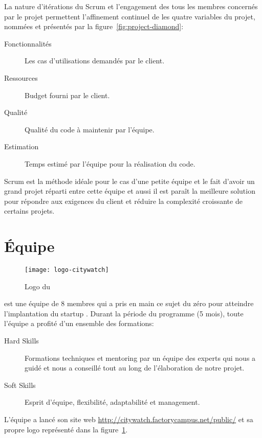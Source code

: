 La nature d'itérations du Scrum et l'engagement des tous les membres concernés
par le projet permettent l'affinement continuel de les quatre variables du
projet, nommées  et présentés par la
figure~\ref{fig:project-diamond}:

\begin{description}
    \item [Fonctionnalités] Les cas d'utilisations demandés par le client.
    \item [Ressources] Budget fourni par le client.
    \item [Qualité] Qualité du code à maintenir par l'équipe.
    \item [Estimation] Temps estimé par l'équipe pour la réalisation du code.
\end{description}



Scrum est la méthode idéale pour le cas d'une petite équipe et le fait d'avoir
un grand projet réparti entre cette équipe et aussi il est paraît la meilleure
solution pour répondre aux exigences du client et réduire la complexité
croissante de certains projets.


\section{Équipe }

\begin{figure}[h]
    \centering
    \texttt{[image: logo-citywatch]}
    \caption{Logo du }
    \label{fig:logo-citywatch}
\end{figure}


 est une équipe de 8 membres qui a pris en main ce sujet
du zéro pour atteindre l'implantation du startup .
Durant la période du programme (5 mois), toute l'équipe a profité d'un ensemble
des formations:

\begin{description}
 \item [Hard Skills] Formations techniques et mentoring par un équipe des
     experts qui nous a guidé et nous a conseillé tout au long de l'élaboration
     de notre projet.
 \item [Soft Skills] Esprit d'équipe, flexibilité, adaptabilité et management.
\end{description}

L'équipe a lancé son site web \url{http://citywatch.factorycampus.net/public/}
et sa propre logo représenté dans la figure~\ref{fig:logo-citywatch}.

